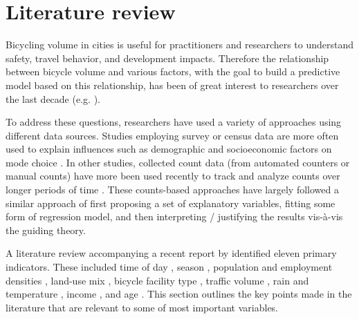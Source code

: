 \documentclass[12pt,letterpaper,article,twocolumn]{memoir}
\begin{document}
\section*{Literature review}
% 
% 

Bicycling volume in cities is useful for practitioners and researchers
to understand safety, travel behavior, and development impacts.
Therefore the relationship between bicycle volume and various factors,
with the goal to build a predictive model based on this relationship,
has been of great interest to researchers over the last decade (e.g.
\cite{Griswold:2011aa,Fields:2012aa,Niemeier:1996aa,Nosal:2014aa}).

To address these questions, researchers have used a variety of
approaches using different data sources. Studies employing survey or
census data are more often used to explain influences such as
demographic and socioeconomic factors on mode choice
\parencite{Parkin:2008aa,Helbich:2014aa}. In other studies, collected
count data (from automated counters or manual counts) have more been
used recently to track and analyze counts over longer periods of
time \parencite{Griswold:2011aa,Nosal:2014aa}. These counts-based
approaches have largely followed a similar approach of first proposing
a set of explanatory variables, fitting some form of regression model,
and then interpreting / justifying the results vis-\`{a}-vis the
guiding theory.

A literature review accompanying a recent report by
\textcite{Bassok:2011aa} identified eleven primary indicators. These included 
time of day \parencite{Schwartz:1999aa}, season \parencite{Niemeier:1996aa},
population and employment densities
\parencite{McCahil:2008aa,Pinjari:2009aa}, land-use mix
\parencite{Pinjari:2009aa}, bicycle facility type \parencite{Hunt:2007aa},
traffic volume \parencite{McDonald:2007aa}, rain and temperature
\parencite{Niemeier:1996aa,Parkin:2008aa},
income \parencite{Turner:1998aa}, and age \parencite{Hunt:2007aa}.
This section outlines the key points made in the literature that are
relevant to some of most important variables.
\end{document}
